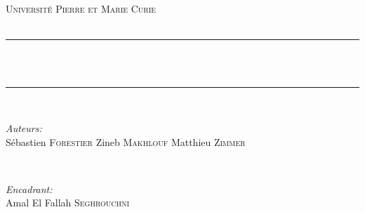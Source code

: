 \begin{titlepage}

\newcommand{\HRule}{\rule{\linewidth}{0.5mm}} %

\center %
 

\textsc{\LARGE Université Pierre et Marie Curie}\\[1.5cm] %
\textsc{\Large \titletype}\\[0.5cm] %


\HRule \\[0.4cm]
{ \huge \bfseries \majortitle}\\[0.4cm] %
\HRule \\[1.5cm]
 
 
 
 

\begin{minipage}{0.4\textwidth}
\begin{flushleft} \large
\emph{Auteurs:}\\
Sébastien \textsc{Forestier} %
Zineb \textsc{Makhlouf} %
Matthieu \textsc{Zimmer} %
\end{flushleft}
\end{minipage}
~
\begin{minipage}{0.4\textwidth}
\begin{flushright} \large
\emph{Encadrant:} \\
Amal El Fallah \textsc{Seghrouchni}\\ %
\end{flushright}
\end{minipage}\\[1cm]


\end{titlepage}
